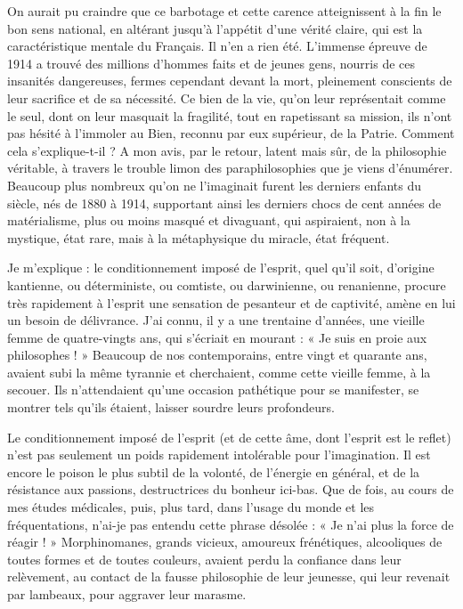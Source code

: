 \documentclass[french,twoside]{book} %
\begin{document}
On aurait pu craindre que ce barbotage et cette carence atteignissent à la fin le bon sens national, en altérant jusqu’à l’appétit d’une vérité claire, qui est la caractéristique mentale du Français. Il n’en a rien été. L’immense épreuve de 1914 a trouvé des millions d’hommes faits et de jeunes gens, nourris de ces insanités dangereuses, fermes cependant devant la mort, pleinement conscients de leur sacrifice et de sa nécessité. Ce bien de la vie, qu’on leur représentait comme le seul, dont on leur masquait la fragilité, tout en rapetissant sa mission, ils n’ont pas hésité à l’immoler au Bien, reconnu par eux supérieur, de la Patrie. Comment cela s’explique-t-il ? A mon avis, par le retour, latent mais sûr, de la philosophie véritable, à travers le trouble limon des paraphilosophies que je viens d’énumérer. Beaucoup plus nombreux qu’on ne l’imaginait furent les derniers enfants du siècle, nés de 1880 à 1914, supportant ainsi les derniers chocs de cent années de matérialisme, plus ou moins masqué et divaguant, qui aspiraient, non à la mystique, état rare, mais à la métaphysique du miracle, état fréquent.\par
Je m’explique : le conditionnement imposé de l’esprit, quel qu’il soit, d’origine kantienne, ou déterministe, ou comtiste, ou darwinienne, ou renanienne, procure très rapidement à l’esprit une sensation de pesanteur et de captivité, amène en lui un besoin de délivrance. J’ai connu, il y a une trentaine d’années, une vieille femme de quatre-vingts ans, qui s’écriait en mourant : « Je suis en proie aux philosophes ! » Beaucoup de nos contemporains, entre vingt et quarante ans, avaient subi la même tyrannie et cherchaient, comme cette vieille femme, à la secouer. Ils n’attendaient qu’une occasion pathétique pour se manifester, se montrer tels qu’ils étaient, laisser sourdre leurs profondeurs.\par
Le conditionnement imposé de l’esprit (et de cette âme, dont l’esprit est le reflet) n’est pas seulement un poids rapidement intolérable pour l’imagination. Il est encore le poison le plus subtil de la volonté, de l’énergie en général, et de la résistance aux passions, destructrices du bonheur ici-bas. Que de fois, au cours de mes études médicales, puis, plus tard, dans l’usage du monde et les fréquentations, n’ai-je pas entendu cette phrase désolée : « Je n’ai plus la force de réagir ! » Morphinomanes, grands vicieux, amoureux frénétiques, alcooliques de toutes formes et de toutes couleurs, avaient perdu la confiance dans leur relèvement, au contact de la fausse philosophie de leur jeunesse, qui leur revenait par lambeaux, pour aggraver leur marasme.\par
\end{document}
